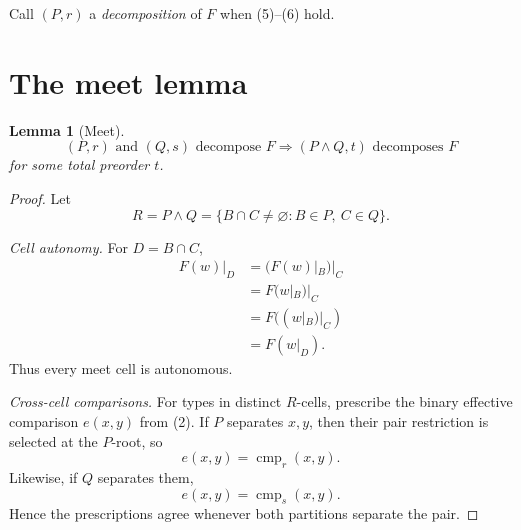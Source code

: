 \documentclass{amsart}
\theoremstyle{plain}
\newtheorem{lemma}{Lemma}
\theoremstyle{definition}
\begin{document}
Call $(P,r)$ a \emph{decomposition} of $F$ when (5)--(6) hold.

\section{The meet lemma}

\begin{lemma}[Meet]
\begin{equation*}
(P,r)\text{ and }(Q,s)\text{ decompose }F
\Longrightarrow
(P\wedge Q,t)\text{ decomposes }F
\tag{7}
\end{equation*}
for some total preorder $t$.
\end{lemma}

\begin{proof}
Let
\[
R=P\wedge Q
=\{B\cap C\ne\varnothing:B\in P,\ C\in Q\}.
\]

\smallskip\noindent\textit{Cell autonomy.} For $D=B\cap C$,
\begin{equation*}
\begin{aligned}
F(w)|_D
&=(F(w)|_B)|_C\\
&=F(w|_B)|_C\\
&=F((w|_B)|_C)\\
&=F(w|_D).
\end{aligned} \tag{8}
\end{equation*}
Thus every meet cell is autonomous.

\smallskip\noindent\textit{Cross-cell comparisons.} For types in distinct $R$-cells, prescribe the binary effective comparison $e(x,y)$ from (2). If $P$ separates $x,y$, then their pair restriction is selected at the $P$-root, so
\begin{equation*}
e(x,y)=\operatorname{cmp}_r(x,y). \tag{9}
\end{equation*}
Likewise, if $Q$ separates them,
\begin{equation*}
e(x,y)=\operatorname{cmp}_s(x,y). \tag{10}
\end{equation*}
Hence the prescriptions agree whenever both partitions separate the pair.


\end{proof}
\end{document}
